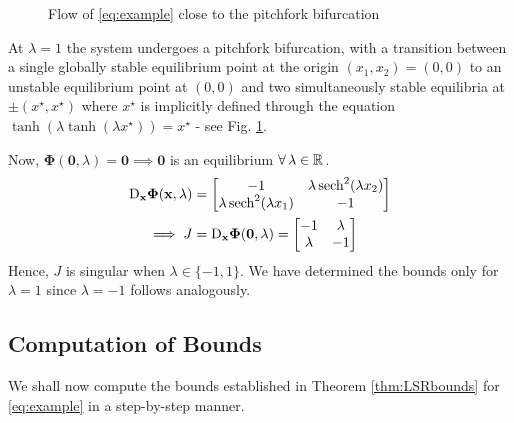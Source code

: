 \documentclass[letterpaper, 10 pt, conference, dvipsnames]{ieeeconf}
\begin{document}
\vspace{-4mm}
\begin{figure}[ht!]
    \centering
    \begin{subfigure}{.24\textwidth}
        \centering
        
    \end{subfigure}%
    \begin{subfigure}{.24\textwidth}
        \centering
        
    \end{subfigure}
    \caption{Flow of \eqref{eq:example} close to the pitchfork bifurcation}\label{fig:flow}
\end{figure}
\vspace{-4mm}

At \(\lambda = 1\) the system undergoes a pitchfork bifurcation, with a transition between a single globally stable equilibrium point at the origin \((x_1,x_2) = (0,0)\) to an unstable equilibrium point at \((0,0)\) and two simultaneously stable equilibria at \(\pm(x^\star,x^\star)\) where \(x^\star\) is implicitly defined through the equation \(\tanh(\lambda\tanh(\lambda x^\star)) = x^\star\) - see Fig. \ref{fig:flow}.

Now, \(\boldsymbol{\Phi}(\mathbf{0},\lambda) = \mathbf{0}\implies\mathbf{0}\) is an equilibrium \(\forall\,\lambda\in\mathbb{R}^{}\).
\begin{align*}
    \mathrm{D}_\mathbf{x}\boldsymbol{\Phi}(\mathbf{x},\lambda) & = \begin{bmatrix}-1&\lambda\sech^2(\lambda x_2)\\\lambda\sech^2(\lambda x_1)&-1\end{bmatrix}                      \\
    \implies J                                                 & = \mathrm{D}_\mathbf{x}\boldsymbol{\Phi}(\mathbf{0},\lambda) = \begin{bmatrix}-1&\lambda\\\lambda&-1\end{bmatrix}
\end{align*}
%
Hence, \(J\) is singular when \(\lambda\in\{-1,1\}\). We have determined the bounds only for \(\lambda=1\) since \(\lambda=-1\) follows analogously.

\vspace{-1mm}
\subsection{Computation of Bounds}
We shall now compute the bounds established in Theorem \ref{thm:LSRbounds} for \eqref{eq:example} in a step-by-step manner.
\end{document}
